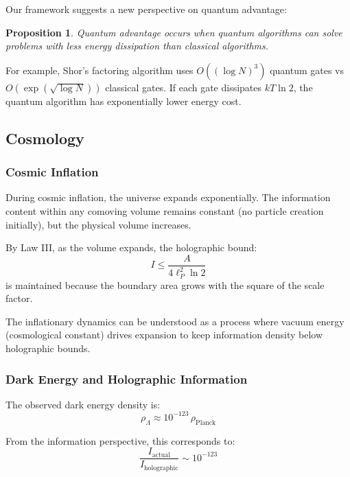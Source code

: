 \documentclass[11pt,a4paper]{article}
\theoremstyle{plain}
\newtheorem{proposition}[theorem]{Proposition}
\theoremstyle{definition}
\theoremstyle{remark}
\begin{document}
Our framework suggests a new perspective on quantum advantage:

\begin{proposition}
Quantum advantage occurs when quantum algorithms can solve problems with less energy dissipation than classical algorithms.
\end{proposition}

For example, Shor's factoring algorithm uses $O((\log N)^3)$ quantum gates vs $O(\exp(\sqrt{\log N}))$ classical gates. If each gate dissipates $kT\ln 2$, the quantum algorithm has exponentially lower energy cost.

\subsection{Cosmology}

\subsubsection{Cosmic Inflation}

During cosmic inflation, the universe expands exponentially. The information content within any comoving volume remains constant (no particle creation initially), but the physical volume increases.

By Law III, as the volume expands, the holographic bound:
\begin{equation}
I \leq \frac{A}{4\ell_P^2\ln 2}
\end{equation}
is maintained because the boundary area grows with the square of the scale factor.

The inflationary dynamics can be understood as a process where vacuum energy (cosmological constant) drives expansion to keep information density below holographic bounds.

\subsubsection{Dark Energy and Holographic Information}

The observed dark energy density is:
\begin{equation}
\rho_{\Lambda} \approx 10^{-123}\,\rho_{\text{Planck}}
\end{equation}

From the information perspective, this corresponds to:
\begin{equation}
\frac{I_{\text{actual}}}{I_{\text{holographic}}} \sim 10^{-123}
\end{equation}
\end{document}
